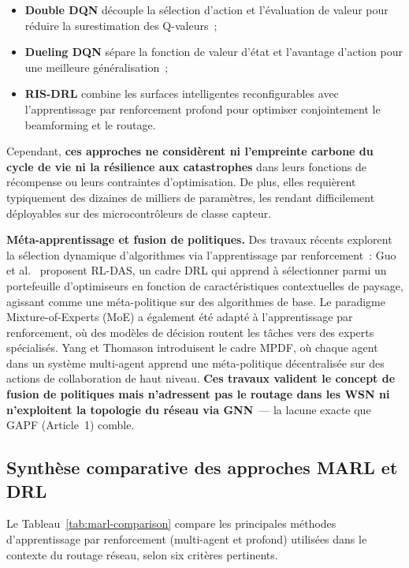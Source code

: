 \begin{itemize}
    \item \textbf{Double DQN} découple la sélection d'action et l'évaluation de valeur pour réduire la surestimation des Q-valeurs~;
    \item \textbf{Dueling DQN} sépare la fonction de valeur d'état et l'avantage d'action pour une meilleure généralisation~;
    \item \textbf{RIS-DRL} combine les surfaces intelligentes reconfigurables avec l'apprentissage par renforcement profond pour optimiser conjointement le beamforming et le routage.
\end{itemize}

Cependant, \textbf{ces approches ne considèrent ni l'empreinte carbone du cycle de vie ni la résilience aux catastrophes} dans leurs fonctions de récompense ou leurs contraintes d'optimisation. De plus, elles requièrent typiquement des dizaines de milliers de paramètres, les rendant difficilement déployables sur des microcontrôleurs de classe capteur.

\textbf{Méta-apprentissage et fusion de politiques.} Des travaux récents explorent la sélection dynamique d'algorithmes via l'apprentissage par renforcement~: Guo et al.\ \cite{guo2024rldas} proposent RL-DAS, un cadre DRL qui apprend à sélectionner parmi un portefeuille d'optimiseurs en fonction de caractéristiques contextuelles de paysage, agissant comme une méta-politique sur des algorithmes de base. Le paradigme Mixture-of-Experts (MoE) a également été adapté à l'apprentissage par renforcement, où des modèles de décision routent les tâches vers des experts spécialisés. Yang et Thomason \cite{yang2025meta_deliberation} introduisent le cadre MPDF, où chaque agent dans un système multi-agent apprend une méta-politique décentralisée sur des actions de collaboration de haut niveau. \textbf{Ces travaux valident le concept de fusion de politiques mais n'adressent pas le routage dans les WSN ni n'exploitent la topologie du réseau via GNN}~--- la lacune exacte que GAPF (Article~1) comble.

\subsection{Synthèse comparative des approches MARL et DRL}

Le Tableau~\ref{tab:marl-comparison} compare les principales méthodes d'apprentissage par renforcement (multi-agent et profond) utilisées dans le contexte du routage réseau, selon six critères pertinents.

